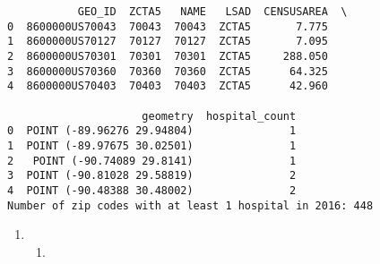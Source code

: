 \documentclass[
  letterpaper,
  DIV=11,
  numbers=noendperiod]{scrartcl}
\providecommand{\tightlist}{%
  \setlength{\itemsep}{0pt}\setlength{\parskip}{0pt}}\usepackage{longtable,booktabs,array}
\begin{document}
\begin{verbatim}
           GEO_ID  ZCTA5   NAME   LSAD  CENSUSAREA  \
0  8600000US70043  70043  70043  ZCTA5       7.775   
1  8600000US70127  70127  70127  ZCTA5       7.095   
2  8600000US70301  70301  70301  ZCTA5     288.050   
3  8600000US70360  70360  70360  ZCTA5      64.325   
4  8600000US70403  70403  70403  ZCTA5      42.960   

                     geometry  hospital_count  
0  POINT (-89.96276 29.94804)               1  
1  POINT (-89.97675 30.02501)               1  
2   POINT (-90.74089 29.8141)               1  
3  POINT (-90.81028 29.58819)               2  
4  POINT (-90.48388 30.48002)               2  
Number of zip codes with at least 1 hospital in 2016: 448
\end{verbatim}

\begin{enumerate}
\def\labelenumi{\arabic{enumi}.}
\setcounter{enumi}{3}
\tightlist
\item
  \begin{enumerate}
  \def\labelenumii{\alph{enumii}.}
  \tightlist
  \item
  \end{enumerate}
\end{enumerate}
\end{document}
